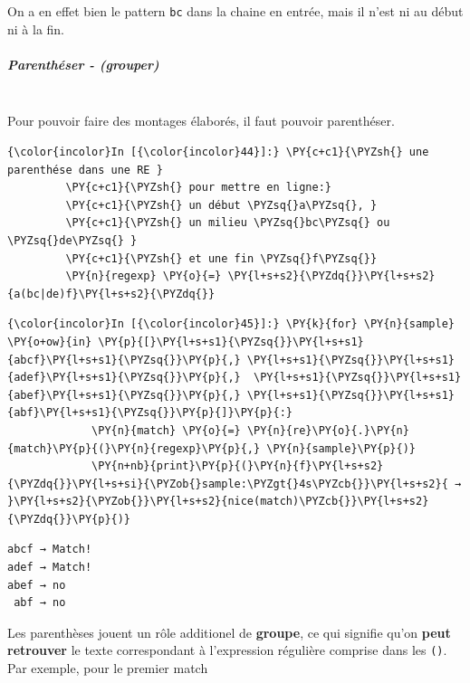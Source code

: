     On a en effet bien le pattern \texttt{bc} dans la chaine en entrée, mais
il n'est ni au début ni à la fin.

    \hypertarget{parenthuxe9ser---grouper}{%
\subparagraph{Parenthéser - (grouper)\\\\}\label{parenthuxe9ser---grouper}}

    Pour pouvoir faire des montages élaborés, il faut pouvoir parenthéser.

    \begin{Verbatim}[commandchars=\\\{\}]
{\color{incolor}In [{\color{incolor}44}]:} \PY{c+c1}{\PYZsh{} une parenthése dans une RE }
         \PY{c+c1}{\PYZsh{} pour mettre en ligne:}
         \PY{c+c1}{\PYZsh{} un début \PYZsq{}a\PYZsq{}, }
         \PY{c+c1}{\PYZsh{} un milieu \PYZsq{}bc\PYZsq{} ou \PYZsq{}de\PYZsq{} }
         \PY{c+c1}{\PYZsh{} et une fin \PYZsq{}f\PYZsq{}}
         \PY{n}{regexp} \PY{o}{=} \PY{l+s+s2}{\PYZdq{}}\PY{l+s+s2}{a(bc|de)f}\PY{l+s+s2}{\PYZdq{}}
\end{Verbatim}


    

    \begin{Verbatim}[commandchars=\\\{\}]
{\color{incolor}In [{\color{incolor}45}]:} \PY{k}{for} \PY{n}{sample} \PY{o+ow}{in} \PY{p}{[}\PY{l+s+s1}{\PYZsq{}}\PY{l+s+s1}{abcf}\PY{l+s+s1}{\PYZsq{}}\PY{p}{,} \PY{l+s+s1}{\PYZsq{}}\PY{l+s+s1}{adef}\PY{l+s+s1}{\PYZsq{}}\PY{p}{,}  \PY{l+s+s1}{\PYZsq{}}\PY{l+s+s1}{abef}\PY{l+s+s1}{\PYZsq{}}\PY{p}{,} \PY{l+s+s1}{\PYZsq{}}\PY{l+s+s1}{abf}\PY{l+s+s1}{\PYZsq{}}\PY{p}{]}\PY{p}{:}
             \PY{n}{match} \PY{o}{=} \PY{n}{re}\PY{o}{.}\PY{n}{match}\PY{p}{(}\PY{n}{regexp}\PY{p}{,} \PY{n}{sample}\PY{p}{)}
             \PY{n+nb}{print}\PY{p}{(}\PY{n}{f}\PY{l+s+s2}{\PYZdq{}}\PY{l+s+si}{\PYZob{}sample:\PYZgt{}4s\PYZcb{}}\PY{l+s+s2}{ → }\PY{l+s+s2}{\PYZob{}}\PY{l+s+s2}{nice(match)\PYZcb{}}\PY{l+s+s2}{\PYZdq{}}\PY{p}{)}
\end{Verbatim}


    \begin{Verbatim}[commandchars=\\\{\}]
abcf → Match!
adef → Match!
abef → no
 abf → no

    \end{Verbatim}

    Les parenthèses jouent un rôle additionel de \textbf{groupe}, ce qui
signifie qu'on \textbf{peut retrouver} le texte correspondant à
l'expression régulière comprise dans les \texttt{()}. Par exemple, pour
le premier match

